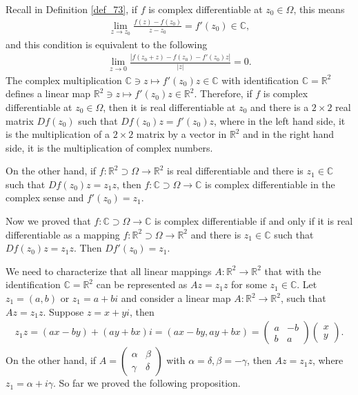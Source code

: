 \documentclass[11pt]{book}
\theoremstyle{definition}
\numberwithin{equation}{chapter}
\begin{document}
Recall in Definition \ref{def_73}, if $f$ is complex differentiable at $z_0 \in \Omega$, this means
\begin{align*}
    \lim_{z \to z_0} \frac{f(z) - f(z_0)}{z - z_0} = f'(z_0) \in \mathbb{C},
\end{align*}
and this condition is equivalent to the following
\begin{align*}
    \lim_{z\to 0} \frac{\left|f(z_0 + z) - f(z_0) - f'(z_0)z\right|}{\left|z\right|} = 0.
\end{align*}
The complex multiplication $\mathbb{C} \ni z \mapsto f'(z_0)z \in \mathbb{C}$ with identification $\mathbb{C} = \mathbb{R}^2$ defines a linear map $\mathbb{R}^2 \ni z \mapsto f'(z_0)z \in \mathbb{R}^2$. Therefore, if $f$ is complex differentiable at $z_0 \in \Omega$, then it is real differentiable at $z_0$ and there is a $2 \times 2$ real matrix $Df(z_0)$ such that $Df(z_0) z = f'(z_0) z$, where in the left hand side, it is the multiplication of a $2 \times 2$ matrix by a vector in $\mathbb{R}^2$ and in the right hand side, it is the multiplication of complex numbers. 

On the other hand, if $f: \mathbb{R}^2 \supset \Omega \to \mathbb{R}^2$ is real differentiable and there is $z_1 \in \mathbb{C}$ such that $Df(z_0) z = z_1 z$, then $f: \mathbb{C} \supset \Omega \to \mathbb{C}$ is complex differentiable in the complex sense and $f'(z_0) = z_1$. 

Now we proved that $f: \mathbb{C} \supset \Omega \to \mathbb{C}$ is complex differentiable if and only if it is real differentiable as a mapping $f: \mathbb{R}^2 \supset \Omega \to \mathbb{R}^2$ and there is $z_1 \in \mathbb{C}$ such that $Df(z_0) z = z_1 z$. Then $Df'(z_0) = z_1$.

We need to characterize that all linear mappings $A: \mathbb{R}^2 \to \mathbb{R}^2$ that with the identification $\mathbb{C} = \mathbb{R}^2$ can be represented as $Az = z_1 z$ for some $z_1 \in \mathbb{C}$. Let $z_1 = (a,b)$ or $z_1 = a + bi$ and consider a linear map $A: \mathbb{R}^2 \to \mathbb{R}^2$, such that $Az = z_1 z$. Suppose $z = x + yi$, then
\begin{align*}
    z_1 z = (ax - by) + (ay + bx)i = (ax - by, ay + bx) = \begin{pmatrix}
    a & -b \\ b & a \end{pmatrix} \begin{pmatrix}
    x \\ y \end{pmatrix}.
\end{align*}
On the other hand, if $A = \begin{pmatrix} \alpha & \beta \\ \gamma & \delta \end{pmatrix}$ with $\alpha = \delta, \beta = - \gamma$, then $Az = z_1 z$, where $z_1 = \alpha + i \gamma$. So far we proved the following proposition.
\end{document}

